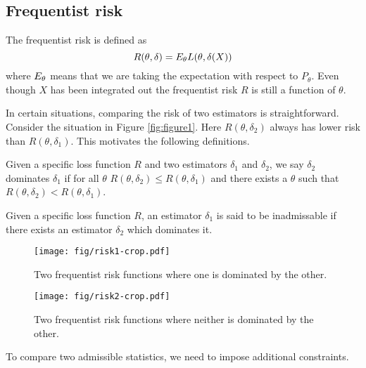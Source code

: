 \documentclass[twoside]{article}
\begin{document}
\subsection{Frequentist risk}

The frequentist risk is defined as
\begin{equation}
R(\theta, \delta) = E_{\theta} L(\theta, \delta(X))
\end{equation}
where $E_{\theta}$ means that we are taking the expectation with respect to
$P_{\theta}$. Even though $X$ has been integrated out the frequentist risk
$R$ is still a function of $\theta$.

In certain situations, comparing the risk of two estimators is straightforward.
Consider the situation in Figure \ref{fig:figure1}.  Here $R(\theta, \delta_2)$
always has lower risk than $R(\theta, \delta_1)$.  This motivates the following
definitions.

\begin{definition}\label{def:dominate}
  Given a specific loss function $R$ and two estimators $\delta_1$ and $\delta_2$,
  we say $\delta_2$ dominates $\delta_1$ if for all $\theta$ $R(\theta, \delta_2)
  \leq R(\theta, \delta_1)$ and there exists a $\theta$ such that $R(\theta,
  \delta_2) < R(\theta, \delta_1)$.
\end{definition}

\begin{definition}\label{def:inadmissable}
  Given a specific loss function $R$, an estimator $\delta_1$ is said to be
  inadmissable if there exists an estimator $\delta_2$ which dominates it. 
\end{definition}

\begin{figure}[ht]
\begin{minipage}[b]{0.45\linewidth}
\centering
\texttt{[image: fig/risk1-crop.pdf]}
\caption{Two frequentist risk functions where one is dominated by the other.}
\label{fig:figure1}
\end{minipage}
\hspace{0.5cm}
\begin{minipage}[b]{0.45\linewidth}
\centering
\texttt{[image: fig/risk2-crop.pdf]}
\caption{Two frequentist risk functions where neither is dominated by the other.}
\label{fig:figure2}
\end{minipage}
\end{figure}

To compare two admissible statistics, we need to impose additional constraints.
\end{document}
